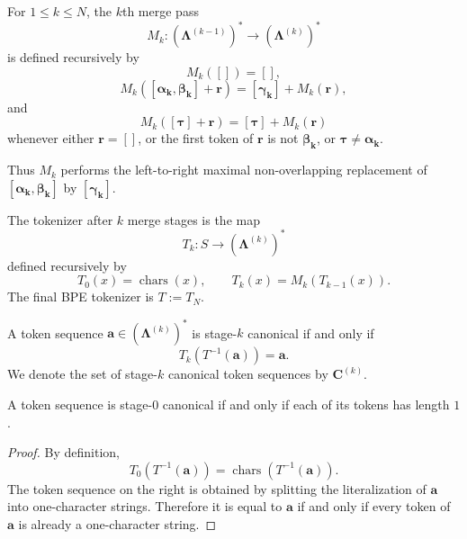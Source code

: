 \begin{definition}
    For $1 \leq k \leq N$, the $k$th merge pass
    \[
    M_k : (\boldsymbol{\Lambda}^{(k-1)})^* \to (\boldsymbol{\Lambda}^{(k)})^*
    \]
    is defined recursively by
    \[
    M_k([]) = [],
    \]
    \[
    M_k([\boldsymbol{\alpha_k}, \boldsymbol{\beta_k}] + \mathbf{r})
    =
    [\boldsymbol{\gamma_k}] + M_k(\mathbf{r}),
    \]
    and
    \[
    M_k([\boldsymbol{\tau}] + \mathbf{r})
    =
    [\boldsymbol{\tau}] + M_k(\mathbf{r})
    \]
    whenever either $\mathbf{r} = []$, or the first token of $\mathbf{r}$ is not $\boldsymbol{\beta_k}$,
    or $\boldsymbol{\tau} \neq \boldsymbol{\alpha_k}$.

    Thus $M_k$ performs the left-to-right maximal non-overlapping replacement of
    $[\boldsymbol{\alpha_k}, \boldsymbol{\beta_k}]$ by $[\boldsymbol{\gamma_k}]$.
\end{definition}

\begin{definition}
    The tokenizer after $k$ merge stages is the map
    \[
    T_k : S \to (\boldsymbol{\Lambda}^{(k)})^*
    \]
    defined recursively by
    \[
    T_0(x) = \operatorname{chars}(x),
    \qquad
    T_k(x) = M_k(T_{k-1}(x)).
    \]
    The final BPE tokenizer is $T := T_N$.
\end{definition}

\begin{definition}
    A token sequence $\mathbf{a} \in (\boldsymbol{\Lambda}^{(k)})^*$ is stage-$k$ canonical if and only if
    \[
    T_k(T^{-1}(\mathbf{a})) = \mathbf{a}.
    \]
    We denote the set of stage-$k$ canonical token sequences by $\mathbf{C}^{(k)}$.
\end{definition}

\begin{proposition}
    \label{prop:bpe-stage-zero-canonicality}
    A token sequence is stage-$0$ canonical if and only if each of its tokens has length $1$.
\end{proposition}
\begin{proof}
    By definition,
    \[
    T_0(T^{-1}(\mathbf{a})) = \operatorname{chars}(T^{-1}(\mathbf{a})).
    \]
    The token sequence on the right is obtained by splitting the literalization of $\mathbf{a}$
    into one-character strings.
    Therefore it is equal to $\mathbf{a}$ if and only if every token of $\mathbf{a}$ is already
    a one-character string.
\end{proof}

